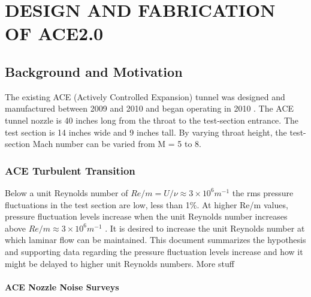 %
%  
%



\chapter{DESIGN AND FABRICATION OF ACE2.0}

\section{Background and Motivation}

The existing ACE (Actively Controlled Expansion) tunnel was designed and manufactured between 2009 and 2010 and began operating in 2010 \cite{ace09,ace10_calibrate,tichenor_dis}. The ACE tunnel nozzle is 40 inches long from the throat to the test-section entrance. The test section is 14 inches wide and 9 inches tall. By varying throat height, the test-section Mach number can be varied from M = 5 to 8.

\subsection{ACE Turbulent Transition}

Below a unit Reynolds number of $Re/m = U/\nu \approx 3 \times 10^6 m^{-1}$ the rms pressure fluctuations in the test section are low, less than 1\%. At higher Re/m values, pressure fluctuation levels increase when the unit Reynolds number increases above $Re/m \approx 3 \times 10^6 m^{-1}$ \cite{aceturb}. It is desired to increase the unit Reynolds number at which laminar flow can be maintained. This document summarizes the hypothesis and supporting data regarding the pressure fluctuation levels increase and how it might be delayed to higher unit Reynolds numbers.
More stuff

\subsubsection{ACE Nozzle Noise Surveys}

